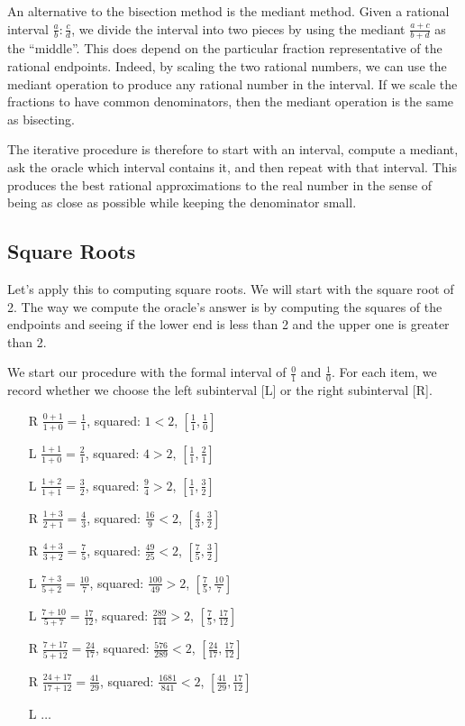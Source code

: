 \documentclass[12pt]{article}
\theoremstyle{remark}
\begin{document}
An alternative to the bisection method is the mediant method. Given a rational interval $\frac{a}{b} : \frac{c}{d}$, we divide the interval into two pieces by using the mediant $\frac{a+c}{b+d}$ as the ``middle''. This does depend on the particular fraction representative of the rational endpoints. Indeed, by scaling the two rational numbers, we can use the mediant operation to produce any rational number in the interval. If we scale the fractions to have common denominators, then the mediant operation is the same as bisecting. 

The iterative procedure is therefore to start with an interval, compute a mediant, ask the oracle which interval contains it, and then repeat with that interval. This produces the best rational approximations to the real number in the sense of being as close as possible while keeping the denominator small. 

\subsection{Square Roots}

Let's apply this to computing square roots. We will start with the square root of 2. The way we compute the oracle's answer is by computing the squares of the endpoints and seeing if the lower end is less than 2 and the upper one is greater than 2.

We start our procedure with the formal interval of $\tfrac{0}{1}$ and $\tfrac{1}{0}$. For each item, we record whether we choose the left subinterval [L] or the right subinterval [R]. 


\begin{itemize}
    \item[R] $\tfrac{0+1}{1+0} = \tfrac{1}{1}$, squared: $1 < 2$,  $[\tfrac{1}{1},\tfrac{1}{0}] $
    \item[L] $\tfrac{1+1}{1+0} = \tfrac{2}{1}$, squared: $4 > 2$, $[\tfrac{1}{1},\tfrac{2}{1}]$
    \item[L] $\tfrac{1+2}{1+1} = \tfrac{3}{2}$, squared: $\tfrac{9}{4} > 2$, $[\tfrac{1}{1},\tfrac{3}{2}]$
    \item[R] $\tfrac{1+3}{2+1} = \tfrac{4}{3}$, squared: $\tfrac{16}{9} < 2$, $[\tfrac{4}{3},\tfrac{3}{2}]$
    \item[R] $\tfrac{4+3}{3+2} = \tfrac{7}{5}$, squared: $\tfrac{49}{25} < 2$, 
    $[\tfrac{7}{5},\tfrac{3}{2}]$
    \item[L] $\tfrac{7+3}{5+2} = \tfrac{10}{7}$, squared: $\tfrac{100}{49} > 2$, 
    $[\tfrac{7}{5},\tfrac{10}{7}]$
    \item[L] $\tfrac{7+10}{5+7} = \tfrac{17}{12}$, squared: $\tfrac{289}{144} > 2$, 
    $[\tfrac{7}{5},\tfrac{17}{12}]$
    \item[R] $\tfrac{7+17}{5+12} = \tfrac{24}{17}$, squared: $\tfrac{576}{289} < 2$, 
    $[\tfrac{24}{17},\tfrac{17}{12}]$
    \item[R] $\tfrac{24+17}{17+12} = \tfrac{41}{29}$, squared: $\tfrac{1681}{841} < 2$, 
    $[\tfrac{41}{29},\tfrac{17}{12}]$
    \item[L] $\ldots$
\end{itemize}
\end{document}
